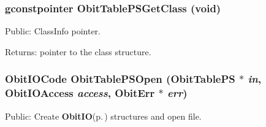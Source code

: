 \subsubsection{\setlength{\rightskip}{0pt plus 5cm}gconstpointer Obit\-Table\-PSGet\-Class (void)}\label{ObitTablePS_8h_a13}


Public: Class\-Info pointer. 

\begin{Desc}
\item[Returns:]pointer to the class structure. \end{Desc}
\subsubsection{\setlength{\rightskip}{0pt plus 5cm}Obit\-IOCode Obit\-Table\-PSOpen ({\bf Obit\-Table\-PS} $\ast$ {\em in}, Obit\-IOAccess {\em access}, {\bf Obit\-Err} $\ast$ {\em err})}\label{ObitTablePS_8h_a17}


Public: Create {\bf Obit\-IO}{\rm (p.\,\pageref{structObitIO})} structures and open file. 

